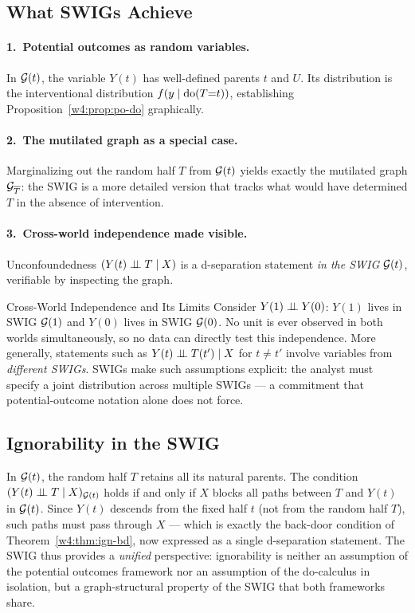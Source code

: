 \documentclass[master.tex]{subfiles}
\begin{document}
\subsection{What SWIGs Achieve}
\label{w4:subsec:swig-achieve}

\paragraph{1.\ Potential outcomes as random variables.}
In $\mathcal{G}(t)$, the variable $Y(t)$ has well-defined parents $t$ and $U$.
Its distribution is the interventional distribution
$f(y \mid \mathrm{do}(T{=}t))$, establishing
Proposition~\ref{w4:prop:po-do} graphically.

\paragraph{2.\ The mutilated graph as a special case.}
Marginalizing out the random half $T$ from $\mathcal{G}(t)$ yields exactly the
mutilated graph $\mathcal{G}_{\overline{T}}$: the SWIG is a more detailed version
that tracks what would have determined $T$ in the absence of intervention.

\paragraph{3.\ Cross-world independence made visible.}
Unconfoundedness $(Y(t) \perp\!\!\!\perp T \mid X)$ is a d-separation statement
\emph{in the SWIG} $\mathcal{G}(t)$, verifiable by inspecting the graph.

\begin{warn}{Cross-World Independence and Its Limits}
Consider $Y(1) \perp\!\!\!\perp Y(0)$: $Y(1)$ lives in SWIG $\mathcal{G}(1)$ and $Y(0)$
lives in SWIG $\mathcal{G}(0)$.  No unit is ever observed in both worlds
simultaneously, so no data can directly test this independence.  More
generally, statements such as $Y(t) \perp\!\!\!\perp T(t') \mid X$ for $t \neq t'$
involve variables from \emph{different SWIGs}.  SWIGs make such
assumptions explicit: the analyst must specify a joint distribution across
multiple SWIGs --- a commitment that potential-outcome notation alone does
not force.
\end{warn}

\subsection{Ignorability in the SWIG}
\label{w4:subsec:swig-ign}

In $\mathcal{G}(t)$, the random half $T$ retains all its natural parents.
The condition $(Y(t) \perp\!\!\!\perp T \mid X)_{\mathcal{G}(t)}$ holds if and only if
$X$ blocks all paths between $T$ and $Y(t)$ in $\mathcal{G}(t)$.  Since $Y(t)$
descends from the fixed half $t$ (not from the random half $T$), such paths
must pass through $X$ --- which is exactly the back-door condition of
Theorem~\ref{w4:thm:ign-bd}, now expressed as a single d-separation
statement.  The SWIG thus provides a \emph{unified} perspective:
ignorability is neither an assumption of the potential outcomes framework
nor an assumption of the do-calculus in isolation, but a graph-structural
property of the SWIG that both frameworks share.
\end{document}
